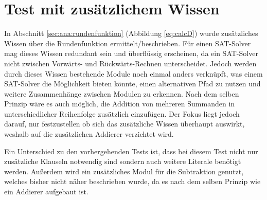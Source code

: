 \section{Test mit zusätzlichem Wissen} %
\label{sec:test_knowledge}

In Abschnitt \ref{sec:ana:rundenfunktion} (Abbildung \ref{eq:calcD}) wurde zusätzliches Wissen über die Rundenfunktion ermittelt/beschrieben.
Für einen SAT-Solver mag dieses Wissen redundant sein und überflüssig erscheinen, da ein SAT-Solver nicht zwischen Vorwärts- und Rückwärts-Rechnen
unterscheidet. Jedoch werden durch dieses Wissen bestehende Module noch einmal anders verknüpft, was einem SAT-Solver die Möglichkeit bieten könnte,
einen alternativen Pfad zu nutzen und weitere Zusammenhänge zwischen Modulen zu erkennen. Nach dem selben Prinzip wäre es auch möglich, die Addition
von mehreren Summanden in unterschiedlicher Reihenfolge zusätzlich einzufügen. Der Fokus liegt jedoch darauf, nur festzustellen ob sich das
zusätzliche Wissen überhaupt auswirkt, weshalb auf die zusätzlichen Addierer verzichtet wird.

Ein Unterschied zu den vorhergehenden Tests ist, dass bei diesem Test nicht nur zusätzliche Klauseln notwendig sind sondern auch weitere Literale
benötigt werden. Außerdem wird ein zusätzliches Modul für die Subtraktion genutzt, welches bisher nicht näher beschrieben wurde, da es nach dem selben
Prinzip wie ein Addierer aufgebaut ist.

